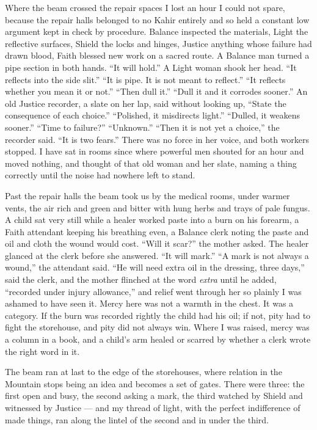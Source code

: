 \ornament

\noindent Where the beam crossed the repair spaces I lost an hour I could not spare, because the repair halls belonged to no Kahir entirely and so held a constant low argument kept in check by procedure. Balance inspected the materials, Light the reflective surfaces, Shield the locks and hinges, Justice anything whose failure had drawn blood, Faith blessed new work on a sacred route. A Balance man turned a pipe section in both hands. ``It will hold.'' A Light woman shook her head. ``It reflects into the side slit.'' ``It is pipe. It is not meant to reflect.'' ``It reflects whether you mean it or not.'' ``Then dull it.'' ``Dull it and it corrodes sooner.'' An old Justice recorder, a slate on her lap, said without looking up, ``State the consequence of each choice.'' ``Polished, it misdirects light.'' ``Dulled, it weakens sooner.'' ``Time to failure?'' ``Unknown.'' ``Then it is not yet a choice,'' the recorder said. ``It is two fears.'' There was no force in her voice, and both workers stopped. I have sat in rooms since where powerful men shouted for an hour and moved nothing, and thought of that old woman and her slate, naming a thing correctly until the noise had nowhere left to stand.\par

Past the repair halls the beam took us by the medical rooms, under warmer vents, the air rich and green and bitter with hung herbs and trays of pale fungus. A child sat very still while a healer worked paste into a burn on his forearm, a Faith attendant keeping his breathing even, a Balance clerk noting the paste and oil and cloth the wound would cost. ``Will it scar?'' the mother asked. The healer glanced at the clerk before she answered. ``It will mark.'' ``A mark is not always a wound,'' the attendant said. ``He will need extra oil in the dressing, three days,'' said the clerk, and the mother flinched at the word \textit{extra} until he added, ``recorded under injury allowance,'' and relief went through her so plainly I was ashamed to have seen it. Mercy here was not a warmth in the chest. It was a category. If the burn was recorded rightly the child had his oil; if not, pity had to fight the storehouse, and pity did not always win. Where I was raised, mercy was a column in a book, and a child's arm healed or scarred by whether a clerk wrote the right word in it.\par

\ornament

\noindent The beam ran at last to the edge of the storehouses, where relation in the Mountain stops being an idea and becomes a set of gates. There were three: the first open and busy, the second asking a mark, the third watched by Shield and witnessed by Justice --- and my thread of light, with the perfect indifference of made things, ran along the lintel of the second and in under the third.\par

